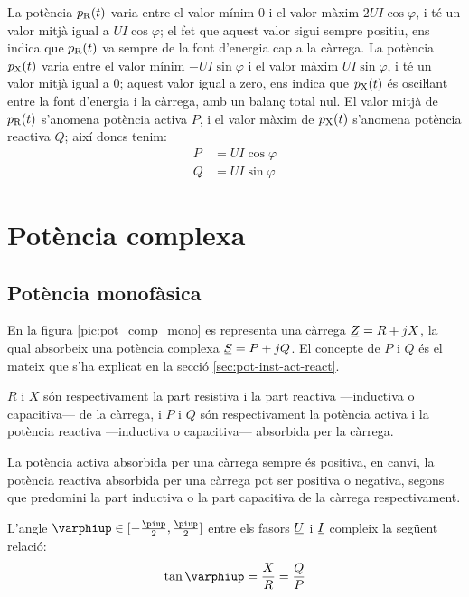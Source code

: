 La potència $p_\mathrm{R}(t)$ varia entre el valor mínim 0 i el valor màxim $2 U I \cos\varphi$, i té un valor mitjà igual a $U I \cos\varphi$; el fet que aquest valor sigui sempre positiu,  ens indica que $p_\mathrm{R}(t)$  va sempre de la font d'energia cap a la càrrega. La potència $p_\mathrm{X}(t)$ varia entre el valor mínim $-U I \sin\varphi$ i el valor  màxim $U I \sin\varphi$, i té un valor mitjà igual a 0; aquest valor igual a zero, ens indica que $p_\mathrm{X}(t)$ és osciŀlant entre la font d'energia i la càrrega, amb un balanç total nul. El valor mitjà de $p_\mathrm{R}(t)$ s'anomena potència activa $P$, i el valor màxim de $p_\mathrm{X}(t)$ s'anomena potència reactiva $Q$; així doncs tenim:
\begin{align}
  P &= U I \cos\varphi \\
  Q &= U I \sin\varphi
\end{align}

\section{Potència complexa}\label{sec:pot_complex} 

\subsection{Potència monofàsica} \label{sec:pot-monof}

En la figura \vref{pic:pot_comp_mono} es representa una càrrega $\cmplx{Z}=R+j X$, la
qual absorbeix una potència complexa $\cmplx{S} = P + j Q$. El concepte de $P$ i $Q$ és el mateix que s'ha explicat en la secció \ref{sec:pot-inst-act-react}.
\begin{center}
    
    \label{pic:pot_comp_mono}
\end{center}

$R$ i $X$ són respectivament la part resistiva i la part reactiva ---inductiva o capacitiva--- de la càrrega, i $P$ i $Q$ són
respectivament la potència activa i la potència reactiva ---inductiva
o capacitiva--- absorbida per la càrrega.

La potència activa absorbida per una càrrega sempre és positiva, en
canvi, la potència reactiva absorbida per una càrrega pot ser
positiva o negativa, segons que predomini la part inductiva o la
part capacitiva de la càrrega respectivament.

L'angle $\varphiup\in[-\frac{\piup}{2},\frac{\piup}{2}]$ entre els fasors $\cmplx{U}$ i $\cmplx{I}$ compleix la següent relació:
\begin{equation}
   \tan\varphiup = \frac{X}{R} = \frac{Q}{P}
\end{equation}

